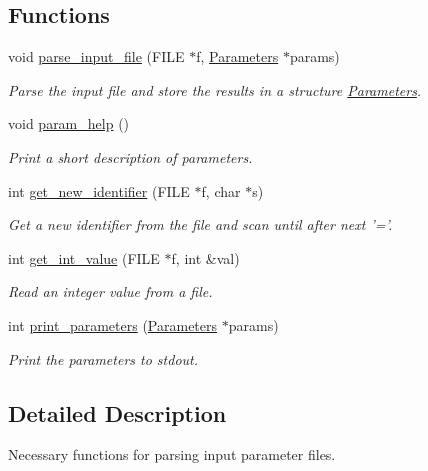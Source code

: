 \subsection*{Functions}
\begin{CompactItemize}
\item 
void \hyperlink{parse-input_8cpp_ecc496a88afbe998e2577dfe766dbd0e}{parse\_\-input\_\-file} (FILE $\ast$f, \hyperlink{struct_parameters}{Parameters} $\ast$params)
\begin{CompactList}\small\item\em Parse the input file and store the results in a structure \hyperlink{struct_parameters}{Parameters}. \item\end{CompactList}\item 
void \hyperlink{parse-input_8cpp_e30f981622da23c664e95e813953673d}{param\_\-help} ()
\begin{CompactList}\small\item\em Print a short description of parameters. \item\end{CompactList}\item 
int \hyperlink{parse-input_8cpp_e28f089803e889dc1c1412f56f482ee7}{get\_\-new\_\-identifier} (FILE $\ast$f, char $\ast$s)
\begin{CompactList}\small\item\em Get a new identifier from the file and scan until after next '='. \item\end{CompactList}\item 
int \hyperlink{parse-input_8cpp_84d83813df0dc09fd6a2a4fbfc893d03}{get\_\-int\_\-value} (FILE $\ast$f, int \&val)
\begin{CompactList}\small\item\em Read an integer value from a file. \item\end{CompactList}\item 
int \hyperlink{parse-input_8cpp_9d6eb3d840afb4c96f4d0e52e61c3bf7}{print\_\-parameters} (\hyperlink{struct_parameters}{Parameters} $\ast$params)
\begin{CompactList}\small\item\em Print the parameters to stdout. \item\end{CompactList}\end{CompactItemize}


\subsection{Detailed Description}
Necessary functions for parsing input parameter files. 



